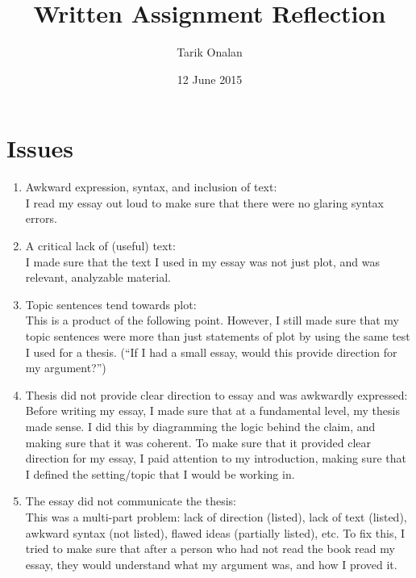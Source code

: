 \documentclass[a4paper,12pt]{article}
\title{Written Assignment Reflection}
\date{12 June 2015}
\author{Tarik Onalan}
\begin{document}
    \maketitle

    \section{Issues}
        \begin{enumerate}
            \item Awkward expression, syntax, and inclusion of text:\\
            I read my essay out loud to make sure that there were no glaring syntax errors.
            \item A critical lack of (useful) text:\\
            I made sure that the text I used in my essay was not just plot, and was relevant,
            analyzable material.
            \item Topic sentences tend towards plot:\\
            This is a product of the following point. However, I still made sure that my topic
            sentences were more than just statements of plot by using the same test I used for
            a thesis. (``If I had a small essay, would this provide direction for my argument?'')
            \item Thesis did not provide clear direction to essay and was awkwardly expressed:\\
            Before writing my essay, I made sure that at a fundamental level, my thesis made sense.
            I did this by diagramming the logic behind the claim, and making sure that it was
            coherent. To make sure that it provided clear direction for my essay, I paid attention
            to my introduction, making sure that I defined the setting/topic that I would be working
            in.
            \item The essay did not communicate the thesis:\\
            This was a multi-part problem: lack of direction (listed), lack of text (listed),
            awkward syntax (not listed), flawed ideas (partially listed), etc. To fix this, I
            tried to make sure that after a person who had not read the book read my essay, they
            would understand what my argument was, and how I proved it.
        \end{enumerate}
\end{document}
